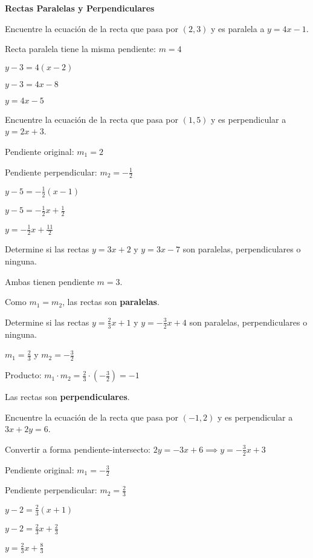 \begin{exercise}
\textbf{Rectas Paralelas y Perpendiculares}

\problem Encuentre la ecuación de la recta que pasa por $(2, 3)$ y es paralela a $y = 4x - 1$.

\begin{solucion}
Recta paralela tiene la misma pendiente: $m = 4$

$y - 3 = 4(x - 2)$

$y - 3 = 4x - 8$

$y = 4x - 5$
\end{solucion}

\problem Encuentre la ecuación de la recta que pasa por $(1, 5)$ y es perpendicular a $y = 2x + 3$.

\begin{solucion}
Pendiente original: $m_1 = 2$

Pendiente perpendicular: $m_2 = -\frac{1}{2}$

$y - 5 = -\frac{1}{2}(x - 1)$

$y - 5 = -\frac{1}{2}x + \frac{1}{2}$

$y = -\frac{1}{2}x + \frac{11}{2}$
\end{solucion}

\problem Determine si las rectas $y = 3x + 2$ y $y = 3x - 7$ son paralelas, perpendiculares o ninguna.

\begin{solucion}
Ambas tienen pendiente $m = 3$.

Como $m_1 = m_2$, las rectas son \textbf{paralelas}.
\end{solucion}

\problem Determine si las rectas $y = \frac{2}{3}x + 1$ y $y = -\frac{3}{2}x + 4$ son paralelas, perpendiculares o ninguna.

\begin{solucion}
$m_1 = \frac{2}{3}$ y $m_2 = -\frac{3}{2}$

Producto: $m_1 \cdot m_2 = \frac{2}{3} \cdot (-\frac{3}{2}) = -1$

Las rectas son \textbf{perpendiculares}.
\end{solucion}

\problem Encuentre la ecuación de la recta que pasa por $(-1, 2)$ y es perpendicular a $3x + 2y = 6$.

\begin{solucion}
Convertir a forma pendiente-intersecto: $2y = -3x + 6 \implies y = -\frac{3}{2}x + 3$

Pendiente original: $m_1 = -\frac{3}{2}$

Pendiente perpendicular: $m_2 = \frac{2}{3}$

$y - 2 = \frac{2}{3}(x + 1)$

$y - 2 = \frac{2}{3}x + \frac{2}{3}$

$y = \frac{2}{3}x + \frac{8}{3}$
\end{solucion}
\end{exercise}

